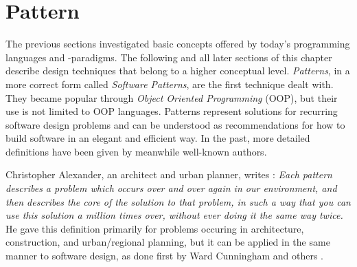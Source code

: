 %
%
%
%
%
%
%

\section{Pattern}
\label{pattern_heading}

The previous sections investigated basic concepts offered by today's
programming languages and -paradigms. The following and all later sections of
this chapter describe design techniques that belong to a higher conceptual
level. \emph{Patterns}, in a more correct form called \emph{Software Patterns},
are the first technique dealt with. They became popular through
\emph{Object Oriented Programming} (OOP), but their use is not limited to OOP
languages. Patterns represent solutions for recurring software design problems
and can be understood as recommendations for how to build software in an
elegant and efficient way. In the past, more detailed definitions have been
given by meanwhile well-known authors.

Christopher Alexander, an architect and urban planner, writes \cite{alexander}:
\textit{Each pattern describes a problem which occurs over and over again in
our environment, and then describes the core of the solution to that problem,
in such a way that you can use this solution a million times over, without ever
doing it the same way twice.} He gave this definition primarily for problems
occuring in architecture, construction, and urban/regional planning, but it can
be applied in the same manner to software design, as done first by Ward
Cunningham and others \cite{portland}.

